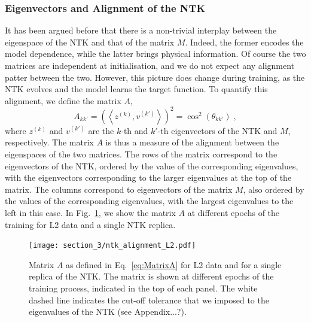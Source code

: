 
\subsubsection{Eigenvectors and Alignment of the NTK}
\label{sec:NTKAlign}

It has been argued before that there is a non-trivial interplay between the
eigenspace of the NTK and that of the matrix $M$. Indeed, the former encodes the
model dependence, while the latter brings physical information. Of course the
two matrices are independent at initialisation, and we do not expect any
alignment patter between the two. However, this picture does change during
training, as the NTK evolves and the model learns the target function. To
quantify this alignment, we define the matrix $A$, 
\begin{equation}
  \label{eq:MatrixA}
  A_{kk'} = \left( \left< z^{(k)}, v^{(k')}\right> \right)^2 = \cos^2(\theta_{kk'}) \;,
\end{equation}
where $z^{(k)}$ and $v^{(k')}$ are the $k$-th and $k'$-th eigenvectors of the
NTK and $M$, respectively. The matrix $A$ is thus a measure of the alignment
between the eigenspaces of the two matrices. The rows of the matrix correspond
to the eigenvectors of the NTK, ordered by the value of the corresponding
eigenvalues, with the eigenvectors corresponding to the larger eigenvalues at
the top of the matrix. The columns correspond to eigenvectors of the matrix $M$,
also ordered by the values of the corresponding eigenvalues, with the largest
eigenvalues to the left in this case. In Fig.~\ref{fig:NtkMAlign}, we show the
matrix $A$ at different epochs of the training for L2 data and a single NTK
replica. 
\begin{figure}[ht!]
  \centering
  \texttt{[image: section\_3/ntk\_alignment\_L2.pdf]}
  \caption{Matrix $A$ as defined in Eq.~\eqref{eq:MatrixA} for L2 data and for a
  single replica of the NTK. The matrix is shown at different epochs of the
  training process, indicated in the top of each panel. The white dashed line
  indicates the cut-off tolerance that we imposed to the eigenvalues of the NTK
  (see Appendix...?).}
  \label{fig:NtkMAlign}
\end{figure}

